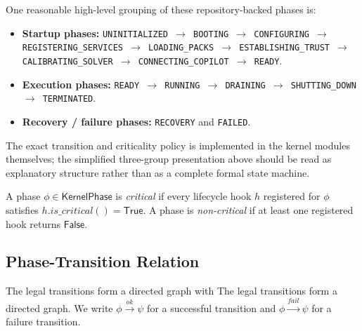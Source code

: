\documentclass[11pt]{article}
\newcommand{\KP}{\mathsf{KernelPhase}}
\begin{document}
One reasonable high-level grouping of these repository-backed phases is:
\begin{itemize}[leftmargin=*]
  \item \textbf{Startup phases:}
        \texttt{UNINITIALIZED $\to$ BOOTING $\to$ CONFIGURING $\to$
        REGISTERING\_SERVICES $\to$ LOADING\_PACKS $\to$
        ESTABLISHING\_TRUST $\to$ CALIBRATING\_SOLVER $\to$
        CONNECTING\_COPILOT $\to$ READY}.
  \item \textbf{Execution phases:}
        \texttt{READY $\to$ RUNNING $\to$ DRAINING $\to$
        SHUTTING\_DOWN $\to$ TERMINATED}.
  \item \textbf{Recovery / failure phases:}
        \texttt{RECOVERY} and \texttt{FAILED}.
\end{itemize}

The exact transition and criticality policy is implemented in the kernel
modules themselves; the simplified three-group presentation above should
be read as explanatory structure rather than as a complete formal state
machine.

\begin{definition}\label{def:critical}
A phase $\phi \in \KP$ is \emph{critical} if every lifecycle hook
$h$ registered for $\phi$ satisfies $h.\mathit{is\_critical}()
= \mathsf{True}$.  A phase is \emph{non-critical} if at least one
registered hook returns $\mathsf{False}$.
\end{definition}

\subsection{Phase-Transition Relation}

The legal transitions form a directed graph with
The legal transitions form a directed graph.  We write
$\phi \xrightarrow{\mathit{ok}} \psi$ for a successful transition
and $\phi \xrightarrow{\mathit{fail}} \psi$ for a failure
transition.
\end{document}

